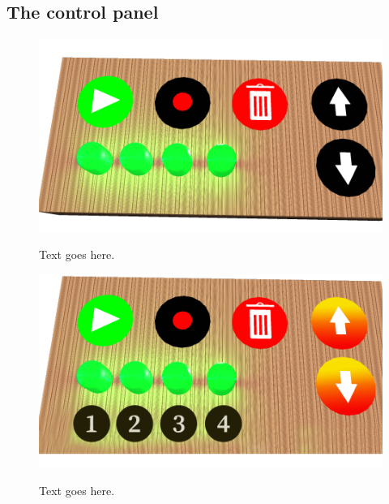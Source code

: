 \subsection{The control panel}

\begin{figure}[H]
	\centering
	\includegraphics[width=0.7\linewidth]{figure/Design/buttonDesign}
	\label{fig:buttonDesign}
	\caption{Text goes here.}	
\end{figure}

\begin{figure}[H]
	\centering
	\includegraphics[width=0.7\linewidth]{figure/Design/buttonDesign2}
	\label{fig:buttonDesign2}
	\caption{Text goes here.}	
\end{figure}





